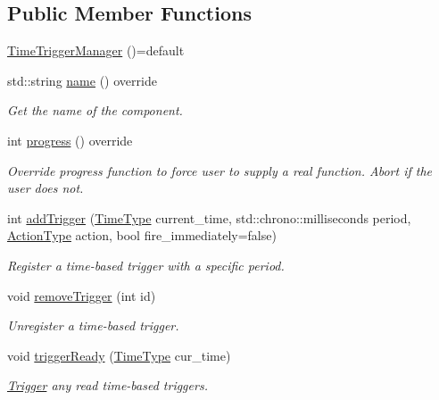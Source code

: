 \subsection*{Public Member Functions}
\begin{DoxyCompactItemize}
\item 
\hyperlink{structvt_1_1timetrigger_1_1_time_trigger_manager_a5739a97e0a8c7a19943d030a04e63a35}{Time\+Trigger\+Manager} ()=default
\item 
std\+::string \hyperlink{structvt_1_1timetrigger_1_1_time_trigger_manager_a8eba6c4f2596f9f8a6ad374ac020c8f4}{name} () override
\begin{DoxyCompactList}\small\item\em Get the name of the component. \end{DoxyCompactList}\item 
int \hyperlink{structvt_1_1timetrigger_1_1_time_trigger_manager_aa2d7955644dc9a1be6e813819b69f711}{progress} () override
\begin{DoxyCompactList}\small\item\em Override progress function to force user to supply a real function. Abort if the user does not. \end{DoxyCompactList}\item 
int \hyperlink{structvt_1_1timetrigger_1_1_time_trigger_manager_a42729a0a83f734dad3ef6d95b5afb3d9}{add\+Trigger} (\hyperlink{namespacevt_a876a9d0cd5a952859c72de8a46881442}{Time\+Type} current\+\_\+time, std\+::chrono\+::milliseconds period, \hyperlink{namespacevt_ae0a5a7b18cc99d7b732cb4d44f46b0f3}{Action\+Type} action, bool fire\+\_\+immediately=false)
\begin{DoxyCompactList}\small\item\em Register a time-\/based trigger with a specific period. \end{DoxyCompactList}\item 
void \hyperlink{structvt_1_1timetrigger_1_1_time_trigger_manager_ae6bdddd787aa88b714686270587e1ff5}{remove\+Trigger} (int id)
\begin{DoxyCompactList}\small\item\em Unregister a time-\/based trigger. \end{DoxyCompactList}\item 
void \hyperlink{structvt_1_1timetrigger_1_1_time_trigger_manager_a57c2be01d872ed68e2261786468e3979}{trigger\+Ready} (\hyperlink{namespacevt_a876a9d0cd5a952859c72de8a46881442}{Time\+Type} cur\+\_\+time)
\begin{DoxyCompactList}\small\item\em \hyperlink{structvt_1_1timetrigger_1_1_trigger}{Trigger} any read time-\/based triggers. \end{DoxyCompactList}\end{DoxyCompactItemize}
